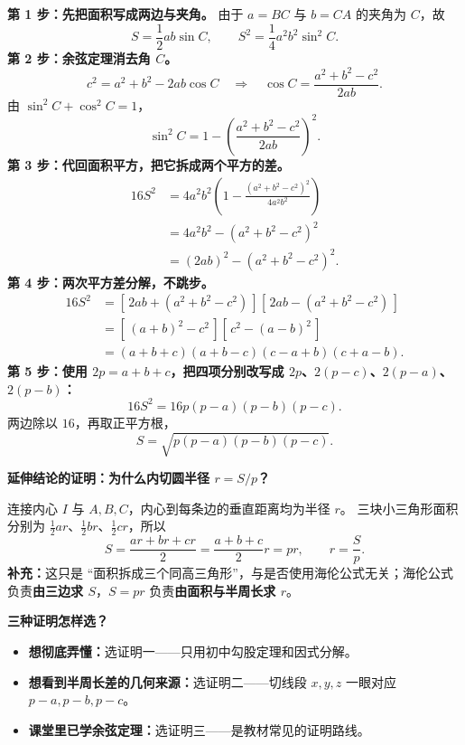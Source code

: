 \begin{proofbox}
\begin{minipage}{\linewidth}
\end{minipage}\par
  \textbf{第 1 步：先把面积写成两边与夹角。}
  由于 $a=BC$ 与 $b=CA$ 的夹角为 $C$，故
  \[
    S=\frac12 ab\sin C,\qquad S^2=\frac14a^2b^2\sin^2 C.
  \]
  \textbf{第 2 步：余弦定理消去角 $C$。}
  \[
   c^2=a^2+b^2-2ab\cos C
   \quad\Longrightarrow\quad
   \cos C=\frac{a^2+b^2-c^2}{2ab}.
  \]
  由 $\sin^2 C+\cos^2 C=1$，
  \[
   \sin^2C=1-\left(\frac{a^2+b^2-c^2}{2ab}\right)^2.
  \]
  \textbf{第 3 步：代回面积平方，把它拆成两个平方的差。}
  \[
    \begin{aligned}
     16S^2
      &=4a^2b^2\left(1-\frac{(a^2+b^2-c^2)^2}{4a^2b^2}\right)\\
      &=4a^2b^2-(a^2+b^2-c^2)^2\\
      &=(2ab)^2-(a^2+b^2-c^2)^2.
    \end{aligned}
  \]
  \textbf{第 4 步：两次平方差分解，不跳步。}
  \[
    \begin{aligned}
     16S^2
     &=[\,2ab+(a^2+b^2-c^2)\,]
       [\,2ab-(a^2+b^2-c^2)\,]\\
     &=[\,(a+b)^2-c^2\,][\,c^2-(a-b)^2\,]\\
     &=(a+b+c)(a+b-c)(c-a+b)(c+a-b).
    \end{aligned}
  \]
  \textbf{第 5 步：使用 $2p=a+b+c$，把四项分别改写成 $2p$、$2(p-c)$、$2(p-a)$、$2(p-b)$：}
  \[
    16S^2=16p(p-a)(p-b)(p-c).
  \]
  两边除以 $16$，再取正平方根，
  \[
    \boxed{S=\sqrt{p(p-a)(p-b)(p-c)}}.
  \]

  \medskip
\par\noindent\begin{minipage}{\linewidth}
  \textbf{\textcolor{CProof}{延伸结论的证明：为什么内切圆半径 $r=S/p$？}}
\end{minipage}\par
  连接内心 $I$ 与 $A,B,C$，内心到每条边的垂直距离均为半径 $r$。
  三块小三角形面积分别为 $\tfrac12 ar$、$\tfrac12 br$、$\tfrac12 cr$，所以
  \[
   S=\frac{ar+br+cr}{2}=\frac{a+b+c}{2}r=pr,
   \qquad\boxed{r=\frac Sp}.
  \]
  \textbf{补充：}这只是 ``面积拆成三个同高三角形''，与是否使用海伦公式无关；海伦公式负责\textbf{由三边求 $S$}，$S=pr$ 负责\textbf{由面积与半周长求 $r$}。

  \medskip
  \textbf{\textcolor{CProof}{三种证明怎样选？}}
  \begin{itemize}[leftmargin=*,itemsep=0.25em]
    \item \textbf{想彻底弄懂：}选证明一——只用初中勾股定理和因式分解。
    \item \textbf{想看到半周长差的几何来源：}选证明二——切线段 $x,y,z$ 一眼对应 $p-a,p-b,p-c$。
    \item \textbf{课堂里已学余弦定理：}选证明三——是教材常见的证明路线。
  \end{itemize}
\end{proofbox}
